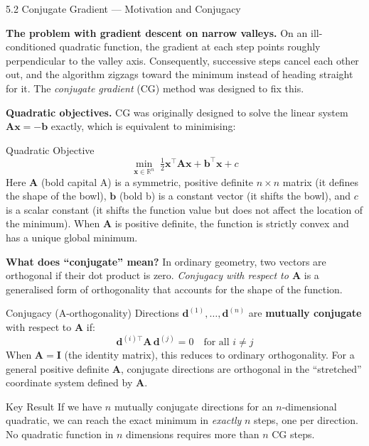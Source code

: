 \documentclass[aspectratio=169,10pt]{beamer}
\newcommand{\vx}{\mathbf{x}}
\newcommand{\vd}{\mathbf{d}}
\newcommand{\vb}{\mathbf{b}}
\newcommand{\mA}{\mathbf{A}}
\newcommand{\R}{\mathbb{R}}
\begin{document}
\begin{frame}[allowframebreaks]{5.2 Conjugate Gradient --- Motivation and Conjugacy}

  \textbf{The problem with gradient descent on narrow valleys.}
  On an ill-conditioned quadratic function, the gradient at each
  step points roughly perpendicular to the valley axis.
  Consequently, successive steps cancel each other out, and
  the algorithm zigzags toward the minimum instead of heading
  straight for it.  The \emph{conjugate gradient} (CG) method
  was designed to fix this.

  \vspace{0.5em}
  \textbf{Quadratic objectives.}  CG was originally designed
  to solve the linear system $\mA\vx = -\vb$ exactly, which
  is equivalent to minimising:

  \begin{block}{Quadratic Objective}
    \[
      \min_{\vx\in\R^n}\;
      \tfrac{1}{2}\vx^\top\mA\vx + \vb^\top\vx + c
    \]
    Here $\mA$ (bold capital A) is a symmetric, positive definite
    $n\times n$ matrix (it defines the shape of the bowl),
    $\vb$ (bold b) is a constant vector (it shifts the bowl),
    and $c$ is a scalar constant (it shifts the function value
    but does not affect the location of the minimum).
    When $\mA$ is positive definite, the function is strictly
    convex and has a unique global minimum.
  \end{block}

  \textbf{What does ``conjugate'' mean?}  In ordinary geometry,
  two vectors are orthogonal if their dot product is zero.
  \emph{Conjugacy with respect to $\mA$} is a generalised
  form of orthogonality that accounts for the shape of the
  function.

  \begin{block}{Conjugacy (A-orthogonality)}
    Directions $\vd^{(1)}, \dots, \vd^{(n)}$ are
    \textbf{mutually conjugate} with respect to $\mA$ if:
    \[
      \vd^{(i)\top}\mA\,\vd^{(j)} = 0
      \quad \text{for all } i \ne j
    \]
    When $\mA = \mathbf{I}$ (the identity matrix), this reduces
    to ordinary orthogonality.  For a general positive definite
    $\mA$, conjugate directions are orthogonal in the
    ``stretched'' coordinate system defined by $\mA$.
  \end{block}

  \begin{alertblock}{Key Result}
    If we have $n$ mutually conjugate directions for an
    $n$-dimensional quadratic, we can reach the exact minimum
    in \emph{exactly} $n$ steps, one per direction.
    No quadratic function in $n$ dimensions requires more
    than $n$ CG steps.
  \end{alertblock}


\end{frame}
\end{document}
